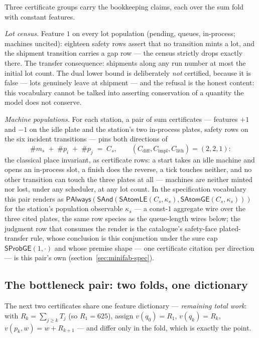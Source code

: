 Three certificate groups carry the bookkeeping claims, each over the
sum fold with constant features.

\emph{Lot census.} Feature $1$ on every lot population (pending,
queues, in-process; machines uncited): eighteen safety rows assert
that no transition mints a lot, and the shipment transition carries
a gap row --- the census strictly drops exactly there. The transfer
consequence: shipments along any run number at most the initial lot
count. The dual lower bound is deliberately \emph{not} certified,
because it is false --- lots genuinely leave at shipment --- and the
refusal is the honest content: this vocabulary cannot be talked into
asserting conservation of a quantity the model does not conserve.

\emph{Machine populations.} For each station, a pair of sum
certificates --- features $+1$ and $-1$ on the idle plate and the
station's two in-process plates, safety rows on the six incident
transitions --- pins both directions of
\[
  \#m_s \;+\; \#p_i \;+\; \#p_j \;=\; C_s ,
  \qquad (C_{\mathrm{diff}}, C_{\mathrm{impl}}, C_{\mathrm{lith}})
  = (2, 2, 1) :
\]
the classical place invariant, as certificate rows: a start takes an
idle machine and opens an in-process slot, a finish does the
reverse, a tick touches neither, and no other transition can touch the
three plates at all --- machines are neither minted nor lost, under
any scheduler, at any lot count. In the specification vocabulary
this pair renders as
$\mathsf{PAlways}(\mathsf{SAnd}(\mathsf{SAtomLE}(C_s, \kappa_s),
\mathsf{SAtomGE}(C_s, \kappa_s)))$ for the station's population
observable $\kappa_s$ --- a const-$1$ aggregate wire over the three
cited plates, the same row species as the queue-length wires below;
the judgment row that consumes the render is the catalogue's
safety-face plated-transfer rule, whose conclusion is this
conjunction under the sure cap $\mathsf{SProbGE}(1, \cdot)$ and
whose premise shape --- one certificate citation per direction ---
is this pair's own (section~\ref{sec:minifab-spec}).

\subsection{The bottleneck pair: two folds, one dictionary}
\label{sec:minifab-bottleneck}

The next two certificates share one feature dictionary ---
\emph{remaining total work}: with $R_k = \sum_{j \ge k} T_j$ (so
$R_1 = 625$), assign $v(q_0) = R_1$, $v(q_k) = R_k$,
$v(p_k, w) = w + R_{k+1}$ --- and differ only in the fold, which is
exactly the point.

